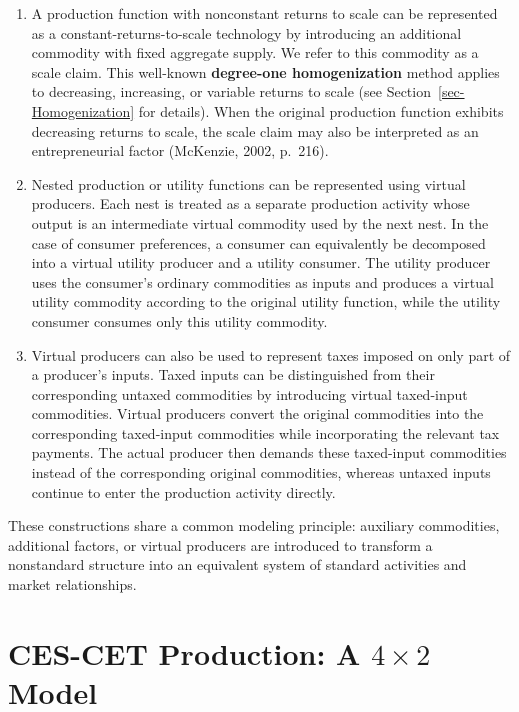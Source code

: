 \documentclass[
  letterpaper,
  DIV=11,
  numbers=noendperiod]{scrreprt}
\begin{document}
\begin{enumerate}
\def\labelenumi{\arabic{enumi}.}
\item
  A production function with nonconstant returns to scale can be
  represented as a constant-returns-to-scale technology by introducing
  an additional commodity with fixed aggregate supply. We refer to this
  commodity as a scale claim. This well-known \textbf{degree-one
  homogenization} method applies to decreasing, increasing, or variable
  returns to scale (see Section~\ref{sec-Homogenization} for details).
  When the original production function exhibits decreasing returns to
  scale, the scale claim may also be interpreted as an entrepreneurial
  factor (McKenzie, 2002, p.~216).
\item
  Nested production or utility functions can be represented using
  virtual producers. Each nest is treated as a separate production
  activity whose output is an intermediate virtual commodity used by the
  next nest. In the case of consumer preferences, a consumer can
  equivalently be decomposed into a virtual utility producer and a
  utility consumer. The utility producer uses the consumer's ordinary
  commodities as inputs and produces a virtual utility commodity
  according to the original utility function, while the utility consumer
  consumes only this utility commodity.
\item
  Virtual producers can also be used to represent taxes imposed on only
  part of a producer's inputs. Taxed inputs can be distinguished from
  their corresponding untaxed commodities by introducing virtual
  taxed-input commodities. Virtual producers convert the original
  commodities into the corresponding taxed-input commodities while
  incorporating the relevant tax payments. The actual producer then
  demands these taxed-input commodities instead of the corresponding
  original commodities, whereas untaxed inputs continue to enter the
  production activity directly.
\end{enumerate}

These constructions share a common modeling principle: auxiliary
commodities, additional factors, or virtual producers are introduced to
transform a nonstandard structure into an equivalent system of standard
activities and market relationships.

\section{\texorpdfstring{CES-CET Production: A \(4\times2\)
Model}{CES-CET Production: A 4\textbackslash times2 Model}}\label{ces-cet-production-a-4times2-model}
\end{document}
